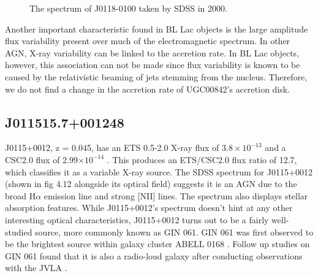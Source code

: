 \begin{figure}[h]
\centering
{}
\caption{The spectrum of J0118-0100 taken by SDSS in 2000.}
\label{imbeded_fb}
\end{figure}

Another important characteristic found in BL Lac objects is the large amplitude flux variability present over much of the electromagnetic spectrum. 
In other AGN, X-ray variability can be linked to the accretion rate. 
In BL Lac objects, however, this association can not be made since flux variability is known to be caused by the relativistic beaming of jets stemming from the nucleus.
Therefore, we do not find a change in the accretion rate of UGC00842’s accretion disk.


\FloatBarrier




\subsection{J011515.7+001248}

J0115+0012, z = 0.045, has an ETS 0.5-2.0 X-ray flux of $3.8\times 10^{-13}$ \fluxunits and a CSC2.0 flux of 2.99$\times 10^{-14}$ \fluxunits. 
This produces an ETS/CSC2.0 flux ratio of 12.7, which classifies it as a variable X-ray source. 
The SDSS spectrum for J0115+0012 (shown in fig 4.12 alongside its optical field) suggests it is an AGN due to the broad H$\alpha$ emission line and strong [NII] lines.
The spectrum also displays stellar absorption features. 
While J0115+0012’s spectrum doesn’t hint at any other interesting optical characteristics, J0115+0012 turns out to be a fairly well-studied source, more commonly known as GIN 061. 
GIN 061 was first observed to be the brightest source within galaxy cluster ABELL 0168 \citep{faber1977}. 
Follow up studies on GIN 061 found that it is also a radio-loud galaxy after conducting observations with the JVLA \citep{baldi2015}. 




